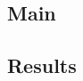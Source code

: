\documentclass[11pt,notitlepage]{article}
\begin{document}
\subsection*{Main}

\subsection*{Results}

\end{document}
